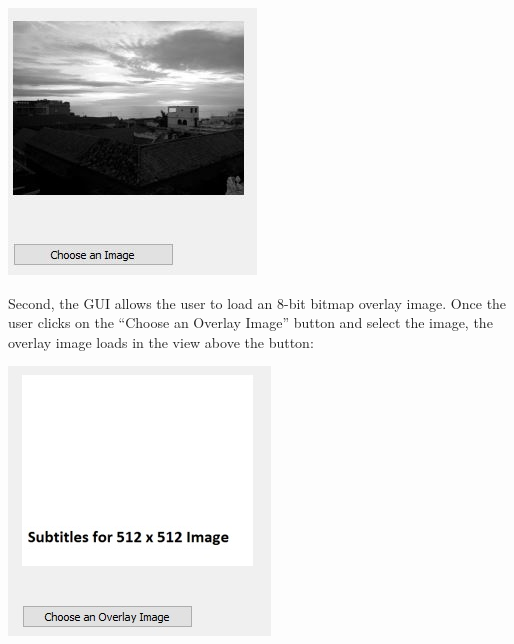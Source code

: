 \documentclass{article}
\newenvironment{Figure}
  {\par\medskip\noindent\ignorespaces\minipage{\linewidth}}
  {\endminipage\par\medskip}
\begin{document}
\begin{multicols*}{2}
\begin{Figure}
 \centering
 \includegraphics[width=\linewidth]{OriginalImage2.jpg}
\end{Figure}

Second, the GUI allows the user to load an 8-bit bitmap overlay image. Once the user clicks on the “Choose an Overlay Image” button and select the image, the overlay image loads in the view above the button:


\begin{Figure}
 \centering
 \includegraphics[width=\linewidth]{OverlayImage.jpg}
\end{Figure}


\end{multicols*}
\end{document}
